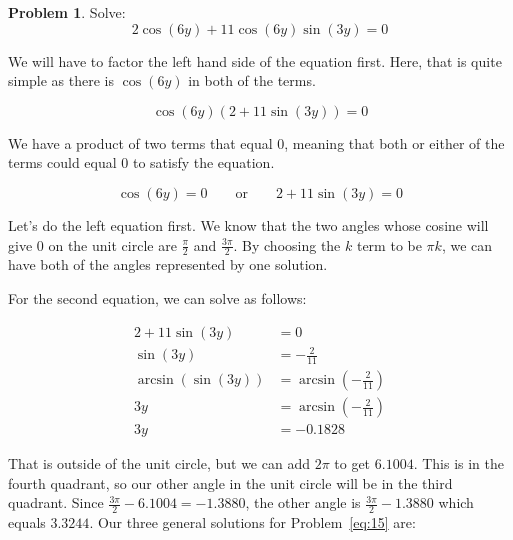 \documentclass[12pt]{article}
\theoremstyle{definition}
\newtheorem{problem}{Problem}
\begin{document}
\begin{problem}
Solve:
\begin{equation*}
    2\cos(6y) + 11\cos(6y)\sin(3y) = 0 \label{eq:15}
\end{equation*}
\end{problem}

We will have to factor the left hand side of the equation first.
Here, that is quite simple as there is $\cos(6y)$ in both of the terms.

\begin{equation}
    \cos(6y)(2+11\sin(3y)) = 0
\end{equation}

We have a product of two terms that equal $0$, meaning that both or either of the terms could equal $0$ to satisfy the equation.

\begin{equation}
    \cos(6y) = 0 \qquad \text{or} \qquad 2+11\sin(3y) = 0
\end{equation}

Let's do the left equation first.
We know that the two angles whose cosine will give $0$ on the unit circle are $\frac{\pi}{2}$ and $\frac{3\pi}{2}$.
By choosing the $k$ term to be $\pi k$, we can have both of the angles represented by one solution.

For the second equation, we can solve as follows:

\begin{align}
    2+11\sin(3y)      & = 0                                 \\
    \sin(3y)          & = -\frac{2}{11}                     \\
    \arcsin(\sin(3y)) & = \arcsin\left(-\frac{2}{11}\right) \\
    3y                & = \arcsin\left(-\frac{2}{11}\right) \\
    3y                & = -0.1828
\end{align}

That is outside of the unit circle, but we can add $2\pi$ to get $6.1004$.
This is in the fourth quadrant, so our other angle in the unit circle will be in the third quadrant.
Since $\frac{3\pi}{2}-6.1004=-1.3880$, the other angle is $\frac{3\pi}{2}-1.3880$ which equals $3.3244$.
Our three general solutions for Problem~\eqref{eq:15} are:
\end{document}
